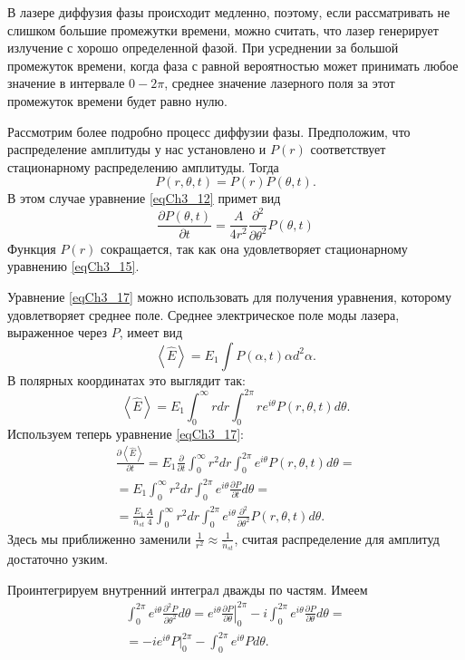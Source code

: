 В лазере диффузия фазы происходит медленно, поэтому, если
рассматривать не слишком большие промежутки времени, можно считать,
что лазер генерирует излучение с хорошо определенной фазой. При
усреднении за большой промежуток времени, когда фаза с равной
вероятностью может принимать любое значение в интервале  $0 - 2
\pi$,  среднее значение лазерного поля за этот промежуток времени 
будет равно нулю.  

Рассмотрим более подробно процесс диффузии фазы. Предположим, что
распределение амплитуды у нас установлено и $P\left(r\right)$
соответствует стационарному распределению амплитуды. Тогда
\[
P\left(r, \theta, t\right) = P\left(r\right) P\left(\theta, t\right).
\]
В этом случае уравнение \eqref{eqCh3_12} примет вид 
\begin{equation}
\frac{\partial P \left(\theta, t\right)}{\partial t} = 
\frac{A}{4 r^2}
\frac{\partial^2}{\partial \theta^2}
P \left(\theta, t\right)
\label{eqCh3_17}
\end{equation}
Функция $P\left(r\right)$ сокращается, так как она удовлетворяет
стационарному уравнению \eqref{eqCh3_15}. 

Уравнение \eqref{eqCh3_17} можно использовать для получения уравнения,
которому удовлетворяет среднее поле. Среднее электрическое поле моды
лазера, выраженное через $P$, имеет вид  
\[
\left<\hat{E}\right> = E_1 \int P\left(\alpha, t\right) \alpha d^2
\alpha.
\]
В полярных координатах это выглядит так:
\[
\left<\hat{E}\right> = E_1 \int_{0}^{\infty}r dr \int_0^{2 \pi}r e^{i
  \theta} P\left(r, \theta, t\right) d \theta.
\]
Используем теперь уравнение \eqref{eqCh3_17}:
\begin{eqnarray}
\frac{\partial \left<\hat{E}\right>}{\partial t}
= E_1 \frac{\partial}{\partial t} \int_{0}^{\infty}r^2 dr \int_0^{2
  \pi} e^{i
  \theta} P\left(r, \theta, t\right) d \theta = 
\nonumber \\
= E_1 \int_0^{\infty}r^2 dr \int_0^{2\pi}e^{i\theta}\frac{\partial
  P}{\partial t} d \theta
=
\nonumber \\
= \frac{E_1}{\bar{n}_{st}} \frac{A}{4}
\int_{0}^{\infty}r^2 dr \int_0^{2 \pi}e^{i
  \theta} \frac{\partial^2}{\partial \theta^2} P\left(r, \theta,
t\right) d \theta. 
\label{eqCh3_18}
\end{eqnarray}
Здесь мы приближенно заменили $\frac{1}{r^2} \approx
\frac{1}{\bar{n}_{st}}$, считая распределение для амплитуд достаточно
узким. 

Проинтегрируем внутренний интеграл дважды по частям. Имеем
\begin{eqnarray}
\int_0^{2 \pi} e^{i \theta}
\frac{\partial^2 P}{\partial \theta^2} d \theta = 
e^{i \theta} \left.\frac{\partial P}{\partial \theta}\right|_0^{2 \pi}
- i \int_0^{2 \pi} e^{i \theta}
\frac{\partial P}{\partial \theta} d \theta = 
\nonumber \\
= -i e^{i \theta} \left. P \right|_0^{2 \pi} - 
\int_0^{2 \pi} e^{i \theta} P d \theta.
\label{eqCh3_19}
\end{eqnarray}

